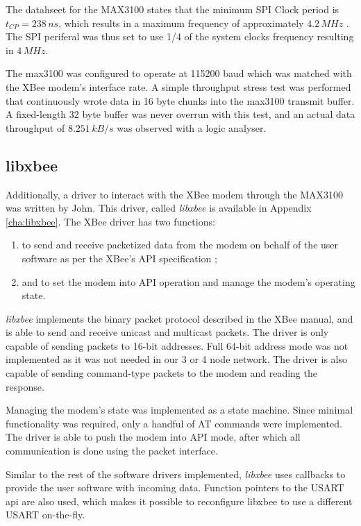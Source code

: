 The datahseet for the MAX3100 states that the minimum SPI Clock period
is $t_{CP}=238\, ns$, which results in a maximum frequency of approximately
$4.2\, MHz$ \cite{MAX3100}. The SPI periferal was thus set to use
1/4 of the system clocks frequency resulting in $4\, MHz$.

The max3100 was configured to operate at 115200 baud which was matched
with the XBee modem's interface rate. A simple throughput stress test
was performed that continuously wrote data in 16 byte chunks into
the max3100 transmit buffer. A fixed-length 32 byte buffer was never
overrun with this test, and an actual data throughput of $8.251\, kB/s$
was observed with a logic analyser.


\subsection{libxbee}

Additionally, a driver to interact with the XBee modem through the
MAX3100 was written by John. This driver, called \emph{libxbee} is
available in Appendix \ref{cha:libxbee}. The XBee driver has two
functions: 
\begin{enumerate}
\item to send and receive packetized data from the modem on behalf of the
user software as per the XBee's API specification \cite{XBeeManual};
\item and to set the modem into API operation and manage the modem's operating
state. 
\end{enumerate}
\emph{libxbee} implements the binary packet protocol described in
the XBee manual, and is able to send and receive unicast and multicast
packets. The driver is only capable of sending packets to 16-bit addresses.
Full 64-bit address mode was not implemented as it was not needed
in our 3 or 4 node network. The driver is also capable of sending
command-type packets to the modem and reading the response.

Managing the modem's state was implemented as a state machine. Since
minimal functionality was required, only a handful of AT commands
were implemented. The driver is able to push the modem into API mode,
after which all communication is done using the packet interface.

Similar to the rest of the software drivers implemented, \emph{libxbee}
uses callbacks to provide the user software with incoming data. Function
pointers to the USART api are also used, which makes it possible to
reconfigure libxbee to use a different USART on-the-fly.

